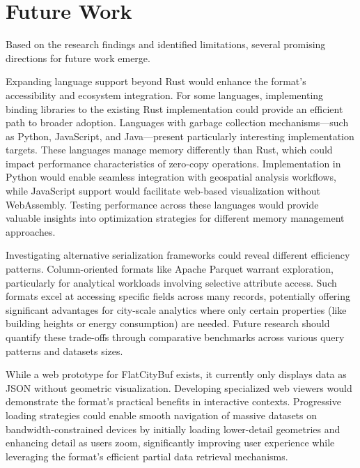 \section{Future Work}
\label{conclusion:future_work}

Based on the research findings and identified limitations, several promising directions for future work emerge.

Expanding language support beyond Rust would enhance the format's accessibility and ecosystem integration. For some languages, implementing binding libraries to the existing Rust implementation could provide an efficient path to broader adoption.
Languages with garbage collection mechanisms—such as Python, JavaScript, and Java—present particularly interesting implementation targets. These languages manage memory differently than Rust, which could impact performance characteristics of zero-copy operations. Implementation in Python would enable seamless integration with geospatial analysis workflows, while JavaScript support would facilitate web-based visualization without WebAssembly.
Testing performance across these languages would provide valuable insights into optimization strategies for different memory management approaches.

Investigating alternative serialization frameworks could reveal different efficiency patterns. Column-oriented formats like Apache Parquet warrant exploration, particularly for analytical workloads involving selective attribute access. Such formats excel at accessing specific fields across many records, potentially offering significant advantages for city-scale analytics where only certain properties (like building heights or energy consumption) are needed. Future research should quantify these trade-offs through comparative benchmarks across various query patterns and datasets sizes.

While a web prototype for FlatCityBuf exists, it currently only displays data as JSON without geometric visualization. Developing specialized web viewers would demonstrate the format's practical benefits in interactive contexts. Progressive loading strategies could enable smooth navigation of massive datasets on bandwidth-constrained devices by initially loading lower-detail geometries and enhancing detail as users zoom, significantly improving user experience while leveraging the format's efficient partial data retrieval mechanisms.
